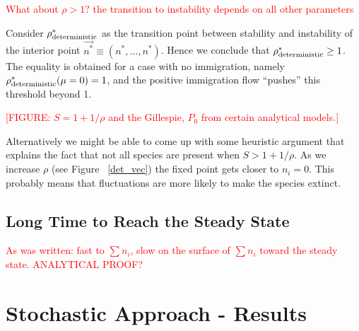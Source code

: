 \documentclass[%
 amsmath,amssymb,
 reprint,%
]{revtex4-2}
\begin{document}
\begin{widetext}
\textcolor{red}{What about $\rho>1?$ the transition to instability depends on all other parameters}

Consider $\rho^*_{\rm deterministic}$ as the transition point between stability and instability of the interior point $\vec{n^*}\equiv (n^*,\dots,n^*)$. Hence we conclude that   $\rho^*_{\rm deterministic}\geq 1$. The equality is obtained for a case with no immigration, namely $\rho^*_{\rm deterministic}(\mu=0)= 1$, and the positive immigration flow ``pushes'' this threshold  beyond 1.  

\textcolor{red}{[FIGURE: $S=1+1/\rho$ and the Gillespie, $P_0$ from certain analytical models.]
}

Alternatively we might be able to come up with some heuristic argument that explains the fact that not all species are present when $S>1+1/\rho$.
As we increase $\rho$ (see Figure ~\ref{det_vec}) the fixed point gets closer to $n_i=0$. This probably means that fluctuations are more likely to make the species extinct.

\subsection{Long Time to Reach the Steady State}

\textcolor{red}{As was written: fast to $\sum n_i$, slow on the surface of $\sum n_i$ toward the steady state. ANALYTICAL PROOF? }

\section{Stochastic Approach - Results}



\end{widetext}
\end{document}
